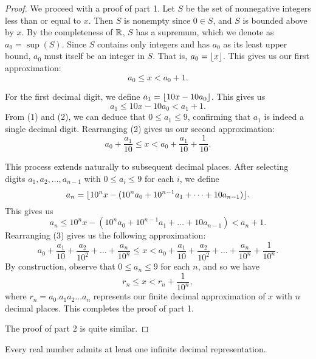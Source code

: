 \begin{proof}
  We proceed with a proof of part 1. Let $S$ be the set of
  nonnegative integers less than or equal to $x$. Then $S$ is
  nonempty since $0 \in S$, and $S$ is bounded above by $x$. By the
  completeness of $\mathbb R$, $S$ has a supremum, which we denote as $a_0
  = \sup(S)$. Since $S$ contains only integers and has $a_0$ as its
  least upper bound, $a_0$ must itself be an integer in $S$. That is,
  $a_0 = \lfloor x \rfloor$. This gives us our first approximation:
  \[ a_0 \leq x < a_0 + 1. \tag{1} \]

  For the first decimal digit, we define $a_1 = \lfloor 10x - 10a_0 \rfloor$.
  This gives us
  \[ a_1 \leq 10x - 10a_0 < a_1 + 1. \tag{2} \]
  From (1) and (2), we can deduce that $0 \leq a_1 \leq 9$, confirming
  that $a_1$ is indeed a single decimal digit. Rearranging (2)
  gives us our second approximation:
  \[ a_0 + \frac{a_1}{10} \leq x < a_0 + \frac{a_1}{10} + \frac{1}{10}. \]

  This process extends naturally to subsequent decimal places.
  After selecting digits $a_1, a_2, \dots, a_{n - 1}$ with $0 \leq a_i
  \leq 9$ for each $i$, we define
  \[ a_n = \lfloor 10^n x - (10^n a_0 + 10^{n - 1} a_1 + \dots + 10
  a_{n - 1}) \rfloor. \]
  This gives us
  \[ a_n \leq 10^n x - (10^n a_0 + 10^{n - 1} a_1 + \dots + 10 a_{n -
  1}) < a_n + 1. \tag{3} \]
  Rearranging (3) gives us the following approximation:
  \[ a_0 + \frac{a_1}{10} + \frac{a_2}{10^2} + \dots +
    \frac{a_n}{10^n} \leq x < a_0 + \frac{a_1}{10} + \frac{a_2}{10^2} +
  \dots + \frac{a_n}{10^n} + \frac{1}{10^n}. \]
  By construction, observe that $0 \leq a_n \leq 9$ for each $n$, and so we have
  \[ r_n \leq x < r_n + \frac{1}{10^n}, \]
  where $r_n = a_0. a_1 a_2 \ldots a_n$ represents our finite decimal
  approximation of $x$ with $n$ decimal places. This completes the
  proof of part 1.

  The proof of part 2 is quite similar.
\end{proof}

\begin{theorem}
  Every real number admits at least one infinite decimal representation.
\end{theorem}

